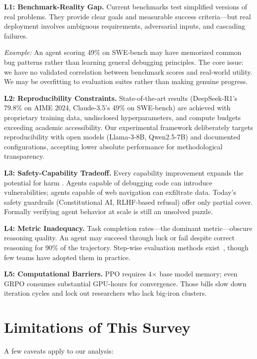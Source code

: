 \documentclass[12pt,a4paper]{report}
\theoremstyle{definition}
\begin{document}
\textbf{L1: Benchmark-Reality Gap.} Current benchmarks test simplified versions of real problems. They provide clear goals and measurable success criteria---but real deployment involves ambiguous requirements, adversarial inputs, and cascading failures.

\textit{Example:} An agent scoring 49\% on SWE-bench may have memorized common bug patterns rather than learning general debugging principles. The core issue: we have no validated correlation between benchmark scores and real-world utility. We may be overfitting to evaluation suites rather than making genuine progress.

\textbf{L2: Reproducibility Constraints.} State-of-the-art results (DeepSeek-R1's 79.8\% on AIME 2024, Claude-3.5's 49\% on SWE-bench) are achieved with proprietary training data, undisclosed hyperparameters, and compute budgets exceeding academic accessibility. Our experimental framework deliberately targets reproducibility with open models (Llama-3-8B, Qwen2.5-7B) and documented configurations, accepting lower absolute performance for methodological transparency.

\textbf{L3: Safety-Capability Tradeoff.} Every capability improvement expands the potential for harm \cite{yin2024os}. Agents capable of debugging code can introduce vulnerabilities; agents capable of web navigation can exfiltrate data. Today's safety guardrails (Constitutional AI, RLHF-based refusal) offer only partial cover. Formally verifying agent behavior at scale is still an unsolved puzzle.

\textbf{L4: Metric Inadequacy.} Task completion rates---the dominant metric---obscure reasoning quality. An agent may succeed through luck or fail despite correct reasoning for 90\% of the trajectory. Step-wise evaluation methods exist~\cite{lightman2023lets}, though few teams have adopted them in practice.

\textbf{L5: Computational Barriers.} PPO requires 4$\times$ base model memory; even GRPO consumes substantial GPU-hours for convergence. Those bills slow down iteration cycles and lock out researchers who lack big-iron clusters.

\section{Limitations of This Survey}
A few caveats apply to our analysis:
\end{document}
